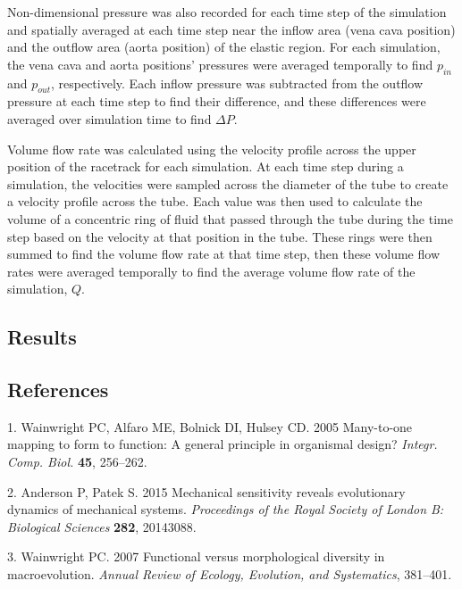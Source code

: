 \documentclass[
]{article}
\begin{document}
Non-dimensional pressure was also recorded for each time step of the
simulation and spatially averaged at each time step near the inflow area
(vena cava position) and the outflow area (aorta position) of the
elastic region. For each simulation, the vena cava and aorta positions'
pressures were averaged temporally to find \(p_{in}\) and \(p_{out}\),
respectively. Each inflow pressure was subtracted from the outflow
pressure at each time step to find their difference, and these
differences were averaged over simulation time to find \(\Delta P\).

Volume flow rate was calculated using the velocity profile across the
upper position of the racetrack for each simulation. At each time step
during a simulation, the velocities were sampled across the diameter of
the tube to create a velocity profile across the tube. Each value was
then used to calculate the volume of a concentric ring of fluid that
passed through the tube during the time step based on the velocity at
that position in the tube. These rings were then summed to find the
volume flow rate at that time step, then these volume flow rates were
averaged temporally to find the average volume flow rate of the
simulation, \(Q\).

\hypertarget{results}{%
\subsection{Results}\label{results}}

\hypertarget{references}{%
\subsection*{References}\label{references}}

\hypertarget{refs}{}
\leavevmode\hypertarget{ref-Wainwright:2005}{}%
1. Wainwright PC, Alfaro ME, Bolnick DI, Hulsey CD. 2005 Many-to-one
mapping to form to function: A general principle in organismal design?
\emph{Integr. Comp. Biol.} \textbf{45}, 256--262.

\leavevmode\hypertarget{ref-Anderson:2015}{}%
2. Anderson P, Patek S. 2015 Mechanical sensitivity reveals evolutionary
dynamics of mechanical systems. \emph{Proceedings of the Royal Society
of London B: Biological Sciences} \textbf{282}, 20143088.

\leavevmode\hypertarget{ref-Wainwright:2007}{}%
3. Wainwright PC. 2007 Functional versus morphological diversity in
macroevolution. \emph{Annual Review of Ecology, Evolution, and
Systematics}, 381--401.
\end{document}
